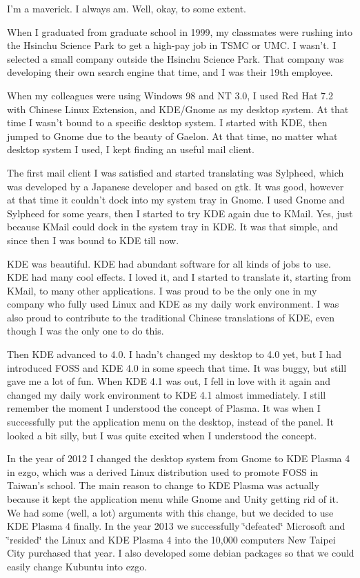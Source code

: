 

\noindent{}I'm a maverick. I always am. Well, okay, to some extent.

When I graduated from graduate school in 1999, my classmates were
rushing into the Hsinchu Science Park to get a high-pay job in TSMC
or UMC. I wasn't. I selected a small company outside the Hsinchu Science
Park. That company was developing their own search engine that time,
and I was their 19th employee.

When my colleagues were using Windows 98 and NT 3.0, I used Red Hat
7.2 with Chinese Linux Extension, and KDE/Gnome as my desktop system.
At that time I wasn't bound to a specific desktop system. I started
with KDE, then jumped to Gnome due to the beauty of Gaelon. At that
time, no matter what desktop system I used, I kept finding an useful
mail client.

The first mail client I was satisfied and started translating was
Sylpheed, which was developed by a Japanese developer and based on
gtk. It was good, however at that time it couldn't dock into my system
tray in Gnome. I used Gnome and Sylpheed for some years, then I started
to try KDE again due to KMail. Yes, just because KMail could dock
in the system tray in KDE. It was that simple, and since then I was
bound to KDE till now.

KDE was beautiful. KDE had abundant software for all kinds of jobs
to use. KDE had many cool effects. I loved it, and I started to translate
it, starting from KMail, to many other applications. I was proud to
be the only one in my company who fully used Linux and KDE as my daily
work environment. I was also proud to contribute to the traditional
Chinese translations of KDE, even though I was the only one to do
this.

Then KDE advanced to 4.0. I hadn't changed my desktop to 4.0 yet,
but I had introduced FOSS and KDE 4.0 in some speech that time. It
was buggy, but still gave me a lot of fun. When KDE 4.1 was out, I
fell in love with it again and changed my daily work environment to
KDE 4.1 almost immediately. I still remember the moment I understood
the concept of Plasma. It was when I successfully put the application
menu on the desktop, instead of the panel. It looked a bit silly,
but I was quite excited when I understood the concept.

In the year of 2012 I changed the desktop system from Gnome to KDE
Plasma 4 in ezgo, which was a derived Linux distribution used to promote
FOSS in Taiwan's school. The main reason to change to KDE Plasma was
actually because it kept the application menu while Gnome and Unity
getting rid of it. We had some (well, a lot) arguments with this change,
but we decided to use KDE Plasma 4 finally. In the year 2013 we successfully
\char`\"{}defeated\char`\"{} Microsoft and \char`\"{}resided\char`\"{}
the Linux and KDE Plasma 4 into the 10,000 computers New Taipei City
purchased that year. I also developed some debian packages so that
we could easily change Kubuntu into ezgo. 

